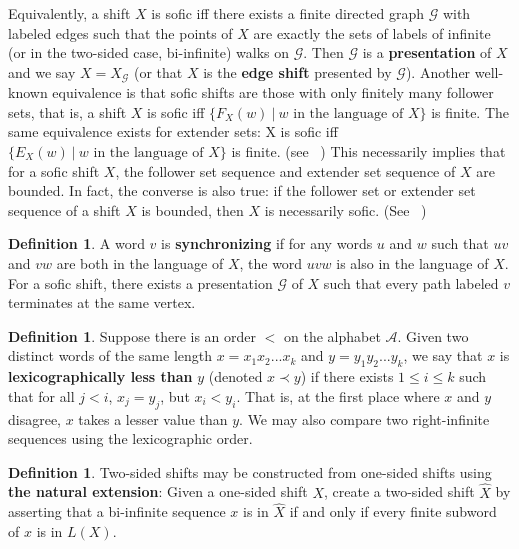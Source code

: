 \documentclass{amsart}
\theoremstyle{definition}
\newtheorem{definition}[theorem]{Definition}
\numberwithin{equation}{section}
\begin{document}
Equivalently, a shift $X$ is sofic iff there exists a finite directed graph $\mathcal{G}$ with labeled edges such that the points of $X$ are exactly the sets of labels of infinite (or in the two-sided case, bi-infinite) walks on $\mathcal{G}$. Then $\mathcal{G}$ is a \textbf{presentation} of $X$ and we say $X = X_\mathcal{G}$ (or that $X$ is the \textbf{edge shift} presented by $\mathcal{G}$). Another well-known equivalence is that sofic shifts are those with only finitely many follower sets, that is, a shift $X$ is sofic iff $\{F_X(w) \ | \ w \text{ in the language of $X$} \}$ is finite. The same equivalence exists for extender sets: X is sofic iff $\{E_X(w) \ | \ w \text{ in the language of $X$} \}$ is finite. (see ~\cite{OrmesPavlov}) This necessarily implies that for a sofic shift $X$, the follower set sequence and extender set sequence of $X$ are bounded. In fact, the converse is also true: if the follower set or extender set sequence of a shift $X$ is bounded, then $X$ is necessarily sofic. (See ~\cite{OrmesPavlov})

\begin{definition}
A word $v$ is \textbf{synchronizing} if for any words $u$ and $w$ such that $uv$ and $vw$ are both in the language of $X$, the word $uvw$ is also in the language of $X$. For a sofic shift, there exists a presentation $\mathcal{G}$ of $X$ such that every path labeled $v$ terminates at the same vertex.
\end{definition}

\begin{definition}
Suppose there is an order $<$ on the alphabet $\mathcal{A}$. Given two distinct words of the same length $x= x_1x_2...x_k$ and $y = y_1y_2...y_k$, we say that $x$ is \textbf{lexicographically less than} $y$ (denoted $x \prec y$) if there exists $1 \leq i \leq k$ such that for all $j <i$, $x_j = y_j$, but $x_i < y_i$. That is, at the first place where $x$ and $y$ disagree, $x$ takes a lesser value than $y$. We may also compare two right-infinite sequences using the lexicographic order.
\end{definition}

\begin{definition}
Two-sided shifts may be constructed from one-sided shifts using \textbf{the natural extension}: Given a one-sided shift $X$, create a two-sided shift $\widehat{X}$ by asserting that a bi-infinite sequence $x$ is in $\widehat{X}$ if and only if every finite subword of $x$ is in $L(X)$.
\end{definition}
\end{document}
